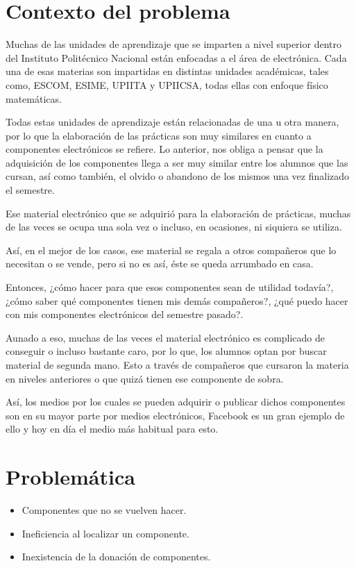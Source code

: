 \section{Contexto del problema}

Muchas de las unidades de aprendizaje que se imparten a nivel superior dentro del Instituto Polit\'ecnico Nacional están enfocadas a el \'area de electr\'onica. Cada una de esas materias son impartidas en distintas unidades académicas, tales como, ESCOM, ESIME, UPIITA y UPIICSA, todas ellas con enfoque f\'isico matem\'aticas.

Todas estas unidades de aprendizaje est\'an relacionadas de una u otra manera, por lo que la elaboración de las prácticas son muy similares en cuanto a componentes electr\'onicos se refiere. Lo anterior, nos obliga a pensar que la adquisición de los componentes llega a ser muy similar entre los alumnos que las cursan, as\'i como tambi\'en, el olvido o abandono de los mismos una vez finalizado el semestre.

Ese material electrónico que se adquirió para la elaboración de prácticas, muchas de las veces se ocupa una sola vez o incluso, en ocasiones, ni siquiera se utiliza.

Así, en el mejor de los casos, ese material se regala a otros compañeros que lo necesitan o se vende, pero si no es así, \'este se queda arrumbado en casa. 

Entonces, ¿cómo hacer para que esos componentes sean de utilidad todavía?, ¿cómo saber qué componentes tienen mis demás compañeros?, ¿qué puedo hacer con mis componentes electrónicos del semestre pasado?.

Aunado a eso, muchas de las veces el material electr\'onico es complicado de conseguir o incluso bastante caro, por lo que, los alumnos optan por buscar material de segunda mano. Esto a través de compañeros que cursaron la materia en niveles anteriores o que quizá tienen ese componente de sobra. 

As\'i, los medios por los cuales se pueden adquirir o publicar dichos componentes son en su mayor parte por medios electr\'onicos, Facebook es un gran ejemplo de ello y hoy en d\'ia el medio m\'as habitual para esto.

\section{Problem\'atica}
\begin{itemize}
    \item Componentes que no se vuelven hacer.
    \item Ineficiencia al localizar un componente.
    \item Inexistencia de la donaci\'on de componentes.
\end{itemize}

